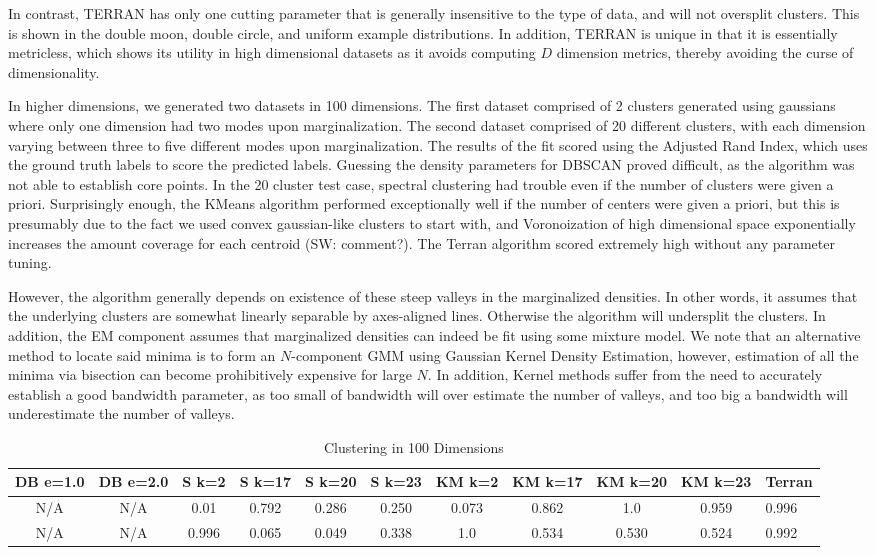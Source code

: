 \documentclass{acm_proc_article-sp}
\begin{document}
In contrast, TERRAN has only one cutting parameter that is generally insensitive to the type of data, and will not oversplit clusters. This is shown in the double moon, double circle, and uniform example distributions. In addition, TERRAN is unique in that it is essentially metricless, which shows its utility in high dimensional datasets as it avoids computing $D$ dimension metrics, thereby avoiding the curse of dimensionality.

In higher dimensions, we generated two datasets in 100 dimensions. The first dataset comprised of 2 clusters generated using gaussians where only one dimension had two modes upon marginalization. The second dataset comprised of 20 different clusters, with each dimension varying between three to five different modes upon marginalization. The results of the fit scored using the Adjusted Rand Index, which uses the ground truth labels to score the predicted labels. Guessing the density parameters for DBSCAN proved difficult, as the algorithm was not able to establish core points. In the 20 cluster test case, spectral clustering had trouble even if the number of clusters were given a priori. Surprisingly enough, the KMeans algorithm performed exceptionally well if the number of centers were given a priori, but this is presumably due to the fact we used convex gaussian-like clusters to start with, and Voronoization of high dimensional space exponentially increases the amount coverage for each centroid (SW: comment?). The Terran algorithm scored extremely high without any parameter tuning. 

However, the algorithm generally depends on existence of these steep valleys in the marginalized densities. In other words, it assumes that the underlying clusters are somewhat linearly separable by axes-aligned lines. Otherwise the algorithm will undersplit the clusters. In addition, the EM component assumes that marginalized densities can indeed be fit using some mixture model. We note that an alternative method to locate said minima is to form an $N$-component GMM using Gaussian Kernel Density Estimation, however, estimation of all the minima via bisection can become prohibitively expensive for large $N$. In addition, Kernel methods suffer from the need to accurately establish a good bandwidth parameter, as too small of bandwidth will over estimate the number of valleys, and too big a bandwidth will underestimate the number of valleys. 

\begin{table*}
\centering
\caption{Clustering in 100 Dimensions}
\begin{tabular}{|c|c|c|c|c|c|c|c|c|c|l|} \hline
DB e=1.0 & DB e=2.0 & S k=2 & S k=17 & S k=20 & S k=23 & KM k=2 & KM k=17 & KM k=20 & KM k=23 & Terran \\ \hline
N/A & N/A & 0.01 & 0.792 & 0.286 & 0.250 & 0.073 & 0.862 & 1.0 & 0.959 & 0.996\\ \hline
N/A & N/A & 0.996 & 0.065 & 0.049 & 0.338 & 1.0 & 0.534 & 0.530 & 0.524 & 0.992\\ \hline \end{tabular}
\end{table*}
\end{document}

